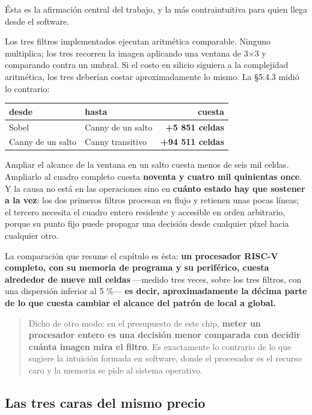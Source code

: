 Ésta es la afirmación central del trabajo, y la más contraintuitiva para
quien llega desde el software.

Los tres filtros implementados ejecutan aritmética comparable. Ninguno
multiplica; los tres recorren la imagen aplicando una ventana de 3×3 y
comparando contra un umbral. Si el costo en silicio siguiera a la
complejidad aritmética, los tres deberían costar aproximadamente lo
mismo. La §5.4.3 midió lo contrario:

\begin{longtable}[]{@{}llr@{}}
\toprule\noalign{}
desde & hasta & cuesta \\
\midrule\noalign{}
\endhead
\bottomrule\noalign{}
\endlastfoot
Sobel & Canny de un salto & \textbf{+5 851 celdas} \\
Canny de un salto & Canny transitivo & \textbf{+94 511 celdas} \\
\end{longtable}

Ampliar el alcance de la ventana en un salto cuesta menos de seis mil
celdas. Ampliarlo al cuadro completo cuesta \textbf{noventa y cuatro mil
quinientas once}. Y la causa no está en las operaciones sino en
\textbf{cuánto estado hay que sostener a la vez}: los dos primeros
filtros procesan en flujo y retienen unas pocas líneas; el tercero
necesita el cuadro entero residente y accesible en orden arbitrario,
porque su punto fijo puede propagar una decisión desde cualquier píxel
hacia cualquier otro.

La comparación que resume el capítulo es ésta: \textbf{un procesador
RISC-V completo, con su memoria de programa y su periférico, cuesta
alrededor de nueve mil celdas} ---medido tres veces, sobre los tres
filtros, con una dispersión inferior al 5 \%--- \textbf{es decir,
aproximadamente la décima parte de lo que cuesta cambiar el alcance del
patrón de local a global.}

\begin{quote}
Dicho de otro modo: en el presupuesto de este chip, \textbf{meter un
procesador entero es una decisión menor comparada con decidir cuánta
imagen mira el filtro}. Es exactamente lo contrario de lo que sugiere la
intuición formada en software, donde el procesador es el recurso caro y
la memoria se pide al sistema operativo.
\end{quote}

\subsection{Las tres caras del mismo
precio}\label{las-tres-caras-del-mismo-precio}

